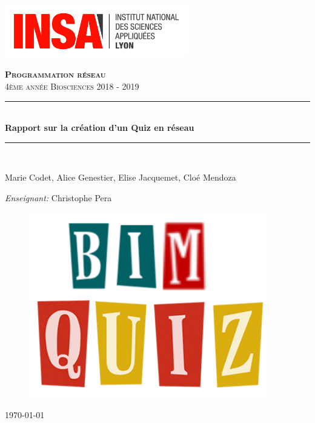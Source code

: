 \documentclass[12pt, a4paper]{article}
\begin{document}
\begin{titlepage}

\newcommand{\HRule}{\rule{\linewidth}{0.5mm}}
\begin{flushleft}
    \includegraphics[width=8cm]{logo.jpg}
\end{flushleft}
\center
\vfill
\textsc{\LARGE \textbf{Programmation réseau}}\\[1.0cm]



\textsc{\large 4ème année Biosciences 2018 - 2019}\\[1.0cm]

\bigskip
\HRule \\[0.4cm]
{\huge \bfseries Rapport sur la création d'un Quiz en réseau}\\[0.4cm]

\HRule \\[1.4cm]

\bigskip
\bigskip

\large Marie Codet, Alice Genestier, Elise Jacquemet,
Cloé Mendoza\\

\bigskip

\textit{Enseignant:}
Christophe Pera

\bigskip
\bigskip

\begin{figure}[H]
\centering
\includegraphics[scale=0.5]{bimquiz.png}
\end{figure}
\vfill
{\large \today}\\[2cm]



\bigskip



\end{titlepage}
\end{document}
